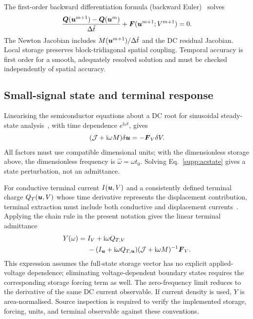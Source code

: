 \documentclass[11pt,a4paper]{article}
\numberwithin{equation}{section}
\begin{document}
The first-order backward differentiation formula (backward
Euler)~\cite{sundialsida} solves
\begin{equation}
\frac{\boldsymbol Q(\boldsymbol{u}^{m+1})-\boldsymbol Q(\boldsymbol{u}^m)}{\Delta\hat t}
+\boldsymbol{F}(\boldsymbol{u}^{m+1};V^{m+1})=0.
\end{equation}
The Newton Jacobian includes $M(\boldsymbol{u}^{m+1})/\Delta\hat t$ and the
DC residual Jacobian. Local storage preserves block-tridiagonal spatial
coupling. Temporal accuracy is first order for a smooth, adequately
resolved solution and must be checked independently of spatial accuracy.

\subsection{Small-signal state and terminal response}
Linearising the semiconductor equations about a DC root for sinusoidal
steady-state analysis~\cite{laux1985}, with time dependence
$e^{\mathrm{i}\omega t}$, gives
\begin{equation}
(\mathcal{J}+\mathrm{i}\omega M)\delta\boldsymbol{u}=-\boldsymbol{F}_V\delta V.
\label{supp:acstate}
\end{equation}
All factors must use compatible dimensional units; with the dimensionless
storage above, the dimensionless frequency is $\hat\omega=\omega t_0$.
Solving Eq.~\eqref{supp:acstate} gives a state perturbation, not an
admittance.

For conductive terminal current $I(\boldsymbol{u},V)$ and a consistently defined
terminal charge $Q_T(\boldsymbol{u},V)$ whose time derivative represents the
displacement contribution, terminal extraction must include both
conductive and displacement currents~\cite{laux1985}. Applying the chain
rule in the present notation gives the linear terminal admittance
\begin{equation}
\begin{split}
Y(\omega)={}&I_V+\mathrm{i}\omega Q_{T,V}\\
&-(I_{\boldsymbol{u}}+\mathrm{i}\omega Q_{T,\boldsymbol{u}})
(\mathcal{J}+\mathrm{i}\omega M)^{-1}\boldsymbol{F}_V.
\end{split}\label{supp:admittance}
\end{equation}
This expression assumes the full-state storage vector has no explicit
applied-voltage dependence; eliminating voltage-dependent boundary states
requires the corresponding storage forcing term as well. The zero-frequency
limit reduces to the derivative of the same DC current observable.
If current density is used, $Y$ is area-normalised. Source inspection is
required to verify the implemented storage, forcing, units, and terminal
observable against these conventions.
\end{document}
